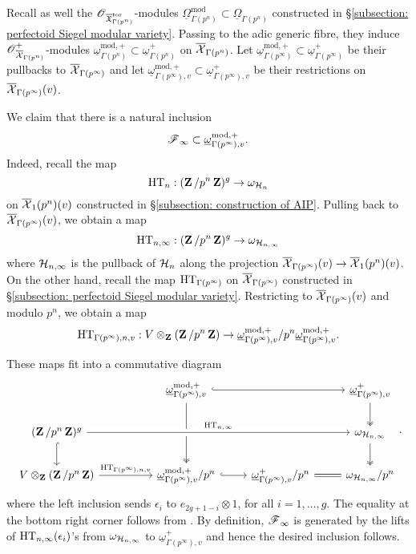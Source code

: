 Recall as well the $\operatorname{\mathscr{O}}_{\overline{\operatorname{\mathfrak{X}}}^{\operatorname{tor}}_{\Gamma(p^n)}}$-modules $\underline{\Omega}_{\Gamma(p^n)}^{\mathrm{mod}}\subset\underline{\Omega}_{\Gamma(p^n)}$ constructed in \S \ref{subsection: perfectoid Siegel modular variety}. Passing to the adic generic fibre, they induce
$\operatorname{\mathscr{O}}^+_{\overline{\operatorname{\mathcal{X}}}_{\Gamma(p^{n})}}$-modules $\underline{\omega}_{\Gamma(p^n)}^{\mathrm{mod}, +} \subset \underline{\omega}_{\Gamma(p^{n})}^+$ on $\overline{\operatorname{\mathcal{X}}}_{\Gamma(p^{n})}$. Let $\underline{\omega}_{\Gamma(p^{\infty})}^{\mathrm{mod}, +}\subset\underline{\omega}_{\Gamma(p^{\infty})}^+$ be their pullbacks to $\overline{\operatorname{\mathcal{X}}}_{\Gamma(p^{\infty})}$ and let $\underline{\omega}_{\Gamma(p^{\infty}), v}^{\mathrm{mod}, +}\subset\underline{\omega}_{\Gamma(p^{\infty}), v}^+$ be their restrictions on $\overline{\operatorname{\mathcal{X}}}_{\Gamma(p^{\infty})}(v)$.

We claim that there is a natural inclusion \[
    \operatorname{\mathscr{F}}_{\infty} \subset \underline{\omega}_{\Gamma(p^{\infty}), v}^{\mathrm{mod}, +}.
\] 
Indeed, recall the map 
$$\operatorname{HT}_n:(\operatorname{\mathbf{Z}}/p^n\operatorname{\mathbf{Z}})^g\rightarrow \omega_{\operatorname{\mathcal{H}}_n}$$
on $\overline{\operatorname{\mathcal{X}}}_1(p^n)(v)$ constructed in \S \ref{subsection: construction of AIP}. Pulling back to $\overline{\operatorname{\mathcal{X}}}_{\Gamma(p^\infty)}(v)$, we obtain a map
$$\operatorname{HT}_{n,\infty}: (\operatorname{\mathbf{Z}}/p^n\operatorname{\mathbf{Z}})^g\rightarrow \omega_{\operatorname{\mathcal{H}}_{n,\infty}}$$
where $\operatorname{\mathcal{H}}_{n,\infty}$ is the pullback of $\operatorname{\mathcal{H}}_n$ along the projection $\overline{\operatorname{\mathcal{X}}}_{\Gamma(p^\infty)}(v)\rightarrow \overline{\operatorname{\mathcal{X}}}_1(p^n)(v)$.
On the other hand, recall the map $\operatorname{HT}_{\Gamma(p^{\infty})}$ on $\overline{\operatorname{\mathcal{X}}}_{\Gamma(p^\infty)}$ constructed in \S \ref{subsection: perfectoid Siegel modular variety}. Restricting to $\overline{\operatorname{\mathcal{X}}}_{\Gamma(p^\infty)}(v)$ and modulo $p^n$, we obtain a map
$$\operatorname{HT}_{\Gamma(p^{\infty}),n,v}: V\otimes_{\operatorname{\mathbf{Z}}}(\operatorname{\mathbf{Z}}/p^n\operatorname{\mathbf{Z}})\rightarrow \underline{\omega}^{\mathrm{mod}, +}_{\Gamma(p^{\infty}),v}/p^n \underline{\omega}^{\mathrm{mod}, +}_{\Gamma(p^{\infty}),v}.$$

These maps fit into a commutative diagram
\[
    \begin{tikzcd}
        &&\underline{\omega}^{\mathrm{mod},+}_{\Gamma(p^{\infty}),v} \arrow[dd, two heads] \arrow[rr, hook] && \underline{\omega}_{\Gamma(p^{\infty}), v}^+\arrow[d, two heads]\\
        (\Z/p^n\Z)^{g}\arrow[rrrr, crossing over, "\HT_{n, \infty}"]\arrow[d, hook] &&& & \omega_{\calH_{n, \infty}}\arrow[d, two heads]\\
        V\otimes_{\Z}(\Z/p^n\Z)\arrow[rr, "\HT_{\Gamma(p^{\infty}),n,v}"] &&\underline{\omega}^{\mathrm{mod},+}_{\Gamma(p^{\infty}),v}/p^n \arrow[r, hook] & \underline{\omega}_{\Gamma(p^{\infty}), v}^+/p^n \arrow[r, equal] & \omega_{\calH_{n, \infty}}/p^n
    \end{tikzcd}.
\] where the left inclusion sends $\epsilon_i$ to $e_{2g+1-i}\otimes 1$, for all $i=1, \ldots, g$. The equality at the bottom right corner follows from \cite[Proposition 3.2.1]{AIP-2015}. By definition, $\operatorname{\mathscr{F}}_{\infty}$ is generated by the lifts of $\operatorname{HT}_{n,\infty}(\epsilon_i)$'s from $\omega_{\operatorname{\mathcal{H}}_{n,\infty}}$ to $\underline{\omega}_{\Gamma(p^{\infty}), v}^+$ and hence the desired inclusion follows.

